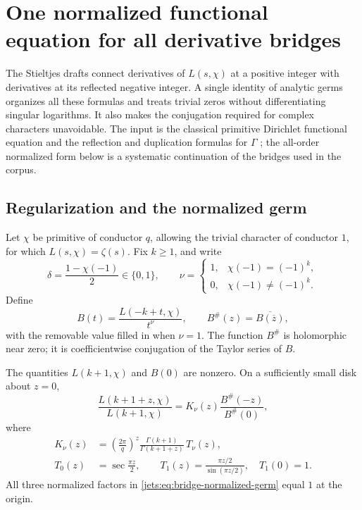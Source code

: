 \section{One normalized functional equation for all derivative bridges}
\label{jets:sec:bridges}

The Stieltjes drafts connect derivatives of \(L(s,\chi)\) at a positive
integer with derivatives at its reflected negative integer. A single
identity of analytic germs organizes all these formulas and treats
trivial zeros without differentiating singular logarithms. It also
makes the conjugation required for complex characters unavoidable.
The input is the classical primitive Dirichlet functional equation
and the reflection and duplication formulas for \(\Gamma\)
\cite{hstruct:DLMF}; the all-order normalized form below is a systematic
continuation of the bridges used in the corpus.

\subsection{Regularization and the normalized germ}

Let \(\chi\) be primitive of conductor \(q\), allowing the trivial
character of conductor \(1\), for which \(L(s,\chi)=\zeta(s)\).
Fix \(k\geq1\), and write
\[
 \delta=\frac{1-\chi(-1)}2\in\{0,1\},\qquad
 \nu=
 \begin{cases}
 1,&\chi(-1)=(-1)^k,\\
 0,&\chi(-1)\ne(-1)^k.
 \end{cases}
\]
Define
\begin{equation}
 B(t)=\frac{L(-k+t,\chi)}{t^\nu},
 \qquad
 B^\#(z)=\overline{B(\overline z)},
 \label{jets:eq:bridge-regularization}
\end{equation}
with the removable value filled in when \(\nu=1\).
The function \(B^\#\) is holomorphic near zero; it is coefficientwise
conjugation of the Taylor series of \(B\).

\begin{theorem}
\label{jets:thm:bridge-normalized}
The quantities \(L(k+1,\chi)\) and \(B(0)\) are nonzero. On a
sufficiently small disk about \(z=0\),
\begin{equation}
 \frac{L(k+1+z,\chi)}{L(k+1,\chi)}
 =
 K_\nu(z)\frac{B^\#(-z)}{B^\#(0)},
 \label{jets:eq:bridge-normalized-germ}
\end{equation}
where
\begin{equation}
 \begin{aligned}
 K_\nu(z)&=
 \left(\frac{2\pi}{q}\right)^z
 \frac{\Gamma(k+1)}{\Gamma(k+1+z)}\,T_\nu(z),\\
 T_0(z)&=\sec\frac{\pi z}{2},\qquad
 T_1(z)=\frac{\pi z/2}{\sin(\pi z/2)},\quad T_1(0)=1.
 \end{aligned}
 \label{jets:eq:bridge-elementary-kernel}
\end{equation}
All three normalized factors in
\eqref{jets:eq:bridge-normalized-germ} equal \(1\) at the origin.
\end{theorem}

